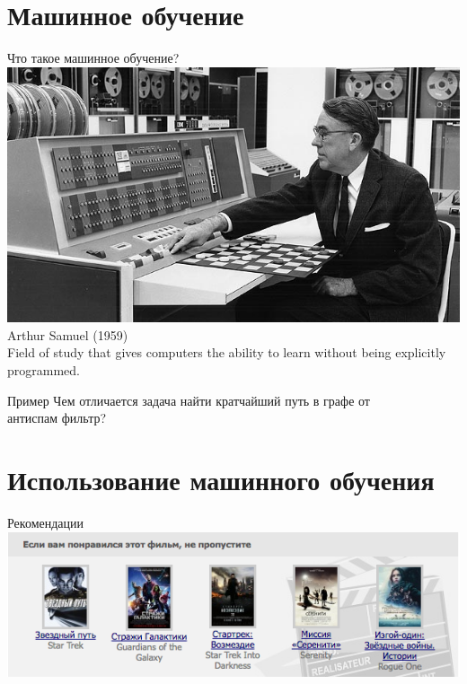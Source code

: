 \documentclass[10pt]{beamer}
\begin{document}
\section{Машинное обучение}

\begin{frame}{Что такое машинное обучение?}
  \includegraphics[width=0.5 \linewidth, height=0.5 \textheight, keepaspectratio]{images/samuel}\\
	Arthur Samuel (1959) \\
	\bigbreak
	Field of study that gives computers the ability to learn without being explicitly programmed.
\end{frame}

\begin{frame}{Пример}
  Чем отличается задача \alert{найти кратчайший путь в графе} от\\  \alert{антиспам фильтр}?
\end{frame}

\section{Использование машинного обучения}

{
\begin{frame}{Рекомендации}
  \centering
  \includegraphics[width=0.9 \linewidth, height=0.9 \textheight, keepaspectratio]{images/recommendations}\\
\end{frame}
}
\end{document}
